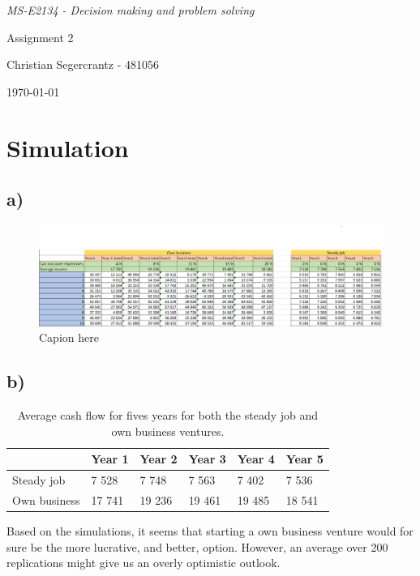 \documentclass{article}
\begin{document}
	\textit{MS-E2134 - Decision making and problem solving}
	\vfill
	{\centering \Huge Assignment 2 \par}
	\vfill
	Christian Segercrantz - 481056 \\
	\par \today
	\pagebreak
	\tableofcontents
	\pagebreak
\section{Simulation}
\subsection{a)}
\begin{figure}[H]
	\includegraphics[width=\textwidth]{1a.png}
	\caption{Capion here}
	\label{fig:1a}
\end{figure}

\subsection{b)}

	\begin{table}[h]
		\centering
		\caption{Average cash flow for fives years for both the steady job and own business ventures.}
		\label{tab:1b}
		\begin{tabular}{l|l|l|l|l|l|}
			\cline{2-6}
			& Year 1 & Year 2 & Year 3 & Year 4 & Year 5 \\ \hline
			\multicolumn{1}{|l|}{Steady job}   & 7 528  & 7 748  & 7 563  & 7 402  & 7 536  \\ \hline
			\multicolumn{1}{|l|}{Own business} & 17 741 & 19 236 & 19 461 & 19 485 & 18 541 \\ \hline
		\end{tabular}
	\end{table}
	
	Based on the simulations, it seems that starting a own business venture would for sure be the more lucrative, and better, option. However, an average over 200 replications might give us an overly optimistic outlook.
\end{document}
